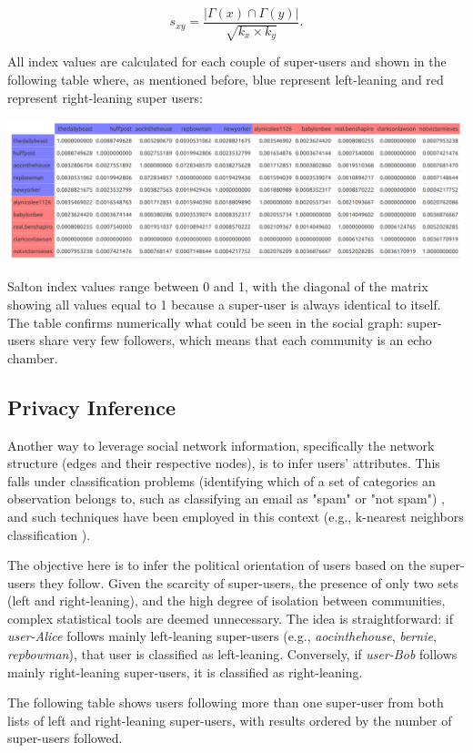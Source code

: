 $$s_{xy}=\frac{|\Gamma(x)\cap\Gamma(y)|}{\sqrt{k_x\times k_y}}.$$

All index values are calculated for each couple of super-users and shown in the following table where, as mentioned before, blue represent left-leaning and red represent right-leaning super users: 

\aCapo{}
\includegraphics[width = .5\textwidth]{images/final_salton_matrix.png}

Salton index values range between 0 and 1, with the diagonal of the matrix showing all values equal to 1 because a super-user is always identical to itself. The table confirms numerically what could be seen in the social graph: super-users share very few followers, which means that each community is an echo chamber.

\subsection{Privacy Inference}
Another way to leverage social network information, specifically the network structure (edges and their respective nodes), is to infer users' attributes. This falls under classification problems (identifying which of a set of categories an observation belongs to, such as classifying an email as "spam" or "not spam") \cite{wikiClassification}, and such techniques have been employed in this context (e.g., k-nearest neighbors classification \cite{wikiKNN}).

The objective here is to infer the political orientation of users based on the super-users they follow. Given the scarcity of super-users, the presence of only two sets (left and right-leaning), and the high degree of isolation between communities, complex statistical tools are deemed unnecessary. The idea is straightforward: if \textit{user-Alice} follows mainly left-leaning super-users (e.g., \textit{aocinthehouse}, \textit{bernie}, \textit{repbowman}), that user is classified as left-leaning. Conversely, if \textit{user-Bob} follows mainly right-leaning super-users, it is classified as right-leaning.

The following table shows users following more than one super-user from both lists of left and right-leaning super-users, with results ordered by the number of super-users followed.

